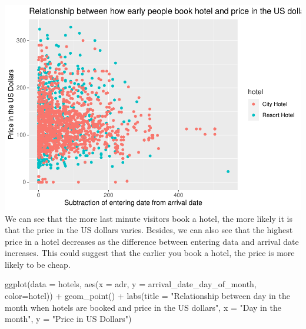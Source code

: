\documentclass[
]{article}
\newenvironment{Shaded}{\begin{snugshade}}{\end{snugshade}}
\newcommand{\AttributeTok}[1]{\textcolor[rgb]{0.77,0.63,0.00}{#1}}
\newcommand{\FunctionTok}[1]{\textcolor[rgb]{0.00,0.00,0.00}{#1}}
\newcommand{\NormalTok}[1]{#1}
\newcommand{\SpecialCharTok}[1]{\textcolor[rgb]{0.00,0.00,0.00}{#1}}
\newcommand{\StringTok}[1]{\textcolor[rgb]{0.31,0.60,0.02}{#1}}
\begin{document}
\includegraphics{written_report_files/figure-latex/unnamed-chunk-6-1.pdf}
We can see that the more last minute visitors book a hotel, the more
likely it is that the price in the US dollars varies. Besides, we can
also see that the highest price in a hotel decreases as the difference
between entering data and arrival date increases. This could suggest
that the earlier you book a hotel, the price is more likely to be cheap.

\begin{Shaded}
\begin{Highlighting}[]
\FunctionTok{ggplot}\NormalTok{(}\AttributeTok{data =}\NormalTok{ hotels, }\FunctionTok{aes}\NormalTok{(}\AttributeTok{x =}\NormalTok{ adr, }\AttributeTok{y =}\NormalTok{ arrival\_date\_day\_of\_month, }\AttributeTok{color=}\NormalTok{hotel)) }\SpecialCharTok{+}
\FunctionTok{geom\_point}\NormalTok{() }\SpecialCharTok{+}
\FunctionTok{labs}\NormalTok{(}\AttributeTok{title =} \StringTok{"Relationship between day in the month when hotels are booked and price in the US dollars"}\NormalTok{,}
  \AttributeTok{x =} \StringTok{"Day in the month"}\NormalTok{,}
  \AttributeTok{y =} \StringTok{"Price in US Dollars"}\NormalTok{) }
\end{Highlighting}
\end{Shaded}
\end{document}
